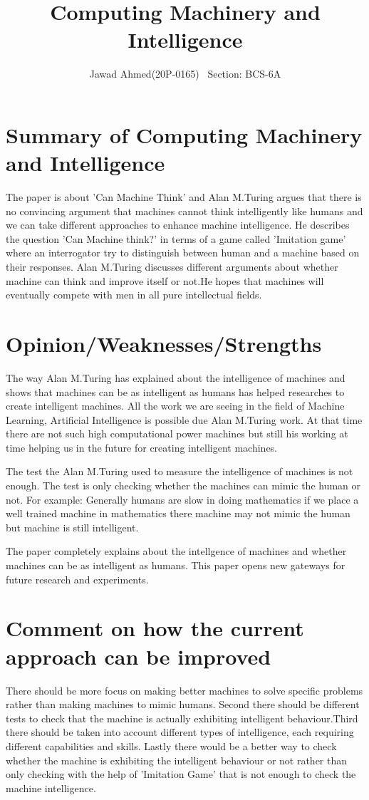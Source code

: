 \documentclass{article}
\title{Computing Machinery and Intelligence}
\author{Jawad Ahmed(20P-0165) \ Section: BCS-6A}
\begin{document}
\maketitle

\section{Summary of Computing Machinery and Intelligence}
The paper is about 'Can Machine Think' and Alan M.Turing argues that there is no convincing argument that machines cannot think intelligently like humans and we can take different approaches to enhance machine intelligence. He describes the question 'Can Machine think?' in terms of a game called 'Imitation game' where an interrogator try to distinguish between human and a machine based on their responses. Alan M.Turing discusses different arguments about whether machine can think and improve itself or not.He hopes that machines will eventually compete with men in all pure intellectual fields.


\section{Opinion/Weaknesses/Strengths}
The way Alan M.Turing has explained about the intelligence of machines and shows that machines can be as intelligent as humans has helped researches to create intelligent machines. All the work we are seeing in the field of Machine Learning, Artificial Intelligence is possible due Alan M.Turing work. At that time there are not such high computational power machines but still his working at time helping us in the future for creating intelligent machines.

The test the Alan  M.Turing used to measure the intelligence of machines is not enough. The test is only checking whether the machines can mimic the human or not. For example: Generally humans are slow in doing mathematics if we place a well trained machine in mathematics there machine may not mimic the human but machine is still intelligent. 

The paper completely explains about the intellgence of machines and whether machines can be as intelligent as humans. This paper opens new gateways for future research and experiments.


\section{Comment on how the current approach can be improved}
There should be more focus on making better machines to solve specific problems rather than making machines to mimic humans. Second there should be different tests to check that the machine is actually exhibiting intelligent behaviour.Third there should be taken into account different types of intelligence, each requiring different capabilities and skills. Lastly there would be a better way to check whether the machine is exhibiting the intelligent behaviour or not rather than only checking with the help of 'Imitation Game' that is not enough to check the machine intelligence.
\end{document}
